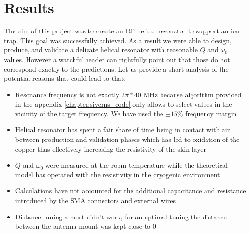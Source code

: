 \chapter{Results}

The aim of this project was to create an RF helical resonator to support an ion trap. This goal was successfully achieved. As a result we were able to design, produce, and validate a delicate helical resonator with reasonable $Q$ and $\omega_0$ values. However a watchful reader can rightfully point out that those do not correspond exactly to the predictions. Let us provide a short analysis of the potential reasons that could lead to that:

\begin{itemize}
	\item Resonance frequency is not exactly $2\pi*40$ MHz because algorithm provided in the appendix \ref{chapter:siverns_code} only allows to select values in the vicinity of the target frequency. We have used the $\pm 15\%$ frequency margin
	\item Helical resonator has spent a fair share of time being in contact with air between production and validation phases which has led to oxidation of the copper thus effectively increasing the resistivity of the skin layer
	\item $Q$ and $\omega_0$ were measured at the room temperature while the theoretical model has operated with the resistivity in the cryogenic environment
	\item Calculations have not accounted for the additional capacitance and resistance introduced by the SMA connectors and external wires
	\item Distance tuning almost didn't work, for an optimal tuning the distance between the antenna mount was kept close to 0
\end{itemize}